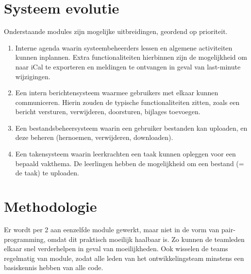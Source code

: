 \documentclass[a4paper]{article}
\begin{document}
\section{Systeem evolutie}
Onderstaande modules zijn mogelijke uitbreidingen, geordend op prioriteit.
\begin{enumerate}
    \item Interne agenda waarin systeembeheerders lessen en algemene activiteiten kunnen inplannen. Extra functionaliteiten hierbinnen zijn de mogelijkheid om naar iCal te exporteren en meldingen te ontvangen in geval van last-minute wijzigingen.
    \item Een intern berichtensysteem waarmee gebruikers met elkaar kunnen communiceren. Hierin zouden de typische functionaliteiten zitten, zoals een bericht versturen, verwijderen, doorsturen, bijlages toevoegen.
    \item Een bestandsbeheersysteem waarin een gebruiker bestanden kan uploaden, en deze beheren (hernoemen, verwijderen, downloaden).
    \item Een takensysteem waarin leerkrachten een taak kunnen opleggen voor een bepaald vakthema. De leerlingen hebben de mogelijkheid om een bestand (= de taak) te uploaden.
\end{enumerate}


\section{Methodologie}
Er wordt per 2 aan eenzelfde module gewerkt, maar niet in de vorm van pair-programming, omdat dit praktisch moeilijk haalbaar is. Zo kunnen de teamleden elkaar snel verderhelpen in geval van moeilijkheden. Ook wisselen de teams regelmatig van module, zodat alle leden van het ontwikkelingsteam minstens een basiskennis hebben van alle code.
\end{document}
